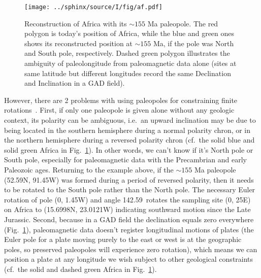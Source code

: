 \begin{figure}[!ht]
  \centering
    \texttt{[image: ../sphinx/source/I/fig/af.pdf]}
  \captionsetup{width=.95\textwidth}
  \caption[The hemispheric ambiguity and absolute paleolongitude indeterminacy
  with a single paleomagnetic pole (paleopole)]{Reconstruction of Africa with
  its ${\sim}155$ Ma paleopole. The red polygon is today's position of Africa,
  while the blue and green ones shows its reconstructed position at ${\sim}155$
  Ma, if the pole was North and South pole, respectively. Dashed green polygon
  illustrates the ambiguity of paleolongitude from paleomagnetic data alone
  (sites at same latitude but different longitudes record the same Declination
  and Inclination in a GAD field).}\label{Fig:chap_intro_reconstructpole}
\end{figure}

However, there are 2 problems with using paleopoles for constraining finite
rotations~\citep{T19}. First, if only one paleopole is given alone without any
geologic context, its polarity can be ambiguous, i.e.\ an upward inclination may
be due to being located in the southern hemisphere during a normal polarity
chron, or in the northern hemisphere during a reversed polarity chron (cf.\ the
solid blue and solid green Africa in Fig.~\ref{Fig:chap_intro_reconstructpole}).
In other words, we can't know if it's North pole or South pole, especially for
paleomagnetic data with the Precambrian and early Paleozoic ages. Returning to
the example above, if the ${\sim}155$ Ma paleopole (52.59\degree{}N,
91.45\degree{}W) was formed during a period of reversed polarity, then it needs
to be rotated to the South pole rather than the North pole. The necessary Euler
rotation of pole (0\degree, 1.45\degree{}W) and angle 142.59\degree\ rotates the
sampling site (0\degree, 25\degree{}E) on Africa to (15.6998\degree{}N,
23.0121\degree{}W) indicating southward motion since the Late Jurassic. Second,
because in a GAD field the declination equals zero everywhere
(Fig.~\ref{Fig:chap_intro_reconstructpole}), paleomagnetic data doesn't register
longitudinal motions of plates (the Euler pole for a plate moving purely to the
east or west is at the geographic poles, so preserved paleopoles will experience
zero rotation), which means we can position a plate at any longitude we wish
subject to other geological constraints (cf.\ the solid and dashed green Africa
in Fig.~\ref{Fig:chap_intro_reconstructpole}).

